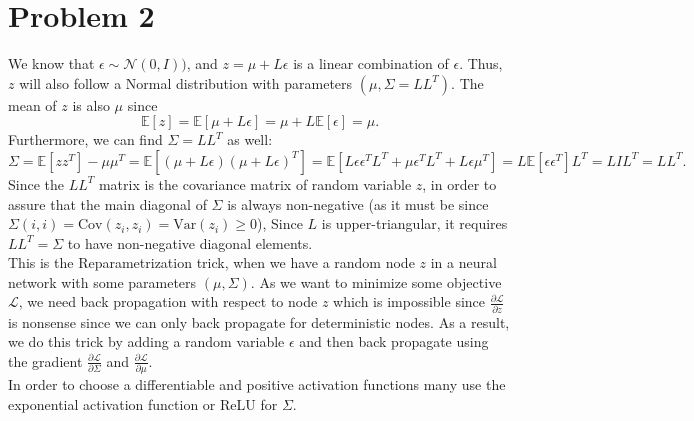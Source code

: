 \documentclass{article}
\begin{document}
\section*{Problem 2}
We know that $\epsilon \sim \mathcal{N} (0,I))$, and $z = \mu + L\epsilon$ is a linear combination of $\epsilon$. Thus, $z$ will also follow a Normal distribution with parameters $(\mu, \Sigma=LL^T)$.
The mean of $z$ is also $\mu$ since
\begin{equation*}
    \mathbb{E} [z] = \mathbb{E} [ \mu + L\epsilon] =  \mu + L \mathbb{E}[\epsilon] = \mu.    
\end{equation*}
Furthermore, we can find $\Sigma = LL^T$ as well:
\begin{equation*}
    \Sigma = \mathbb{E} [z z^T] - \mu \mu^T  =  \mathbb{E} [ (\mu + L\epsilon)( \mu + L\epsilon)^T ] = \mathbb{E} [ L \epsilon \epsilon^T L^T  + \mu \epsilon^T L^T  + L\epsilon \mu^T ] = L\mathbb{E} [ \epsilon \epsilon^T]L^T = LIL^T = LL^T.
\end{equation*}
Since the $LL^T$ matrix is the covariance matrix of random variable $z$, in order to assure that the main diagonal of $\Sigma$ is always non-negative (as it must be since $\Sigma(i,i) = \mathrm{Cov}(z_i, z_i) = \mathrm{Var}(z_i) \geq 0$), Since $L$ is upper-triangular, it requires $LL^T = \Sigma$ to have non-negative diagonal elements.
\\
This is the Reparametrization trick, when we have a random node $z$ in a neural network with some parameters $(\mu, \Sigma)$. As we want to minimize some objective $\mathcal{L}$, we need back propagation with respect to node $z$ which is impossible since $\frac{\partial \mathcal{L}}{\partial z}$ is nonsense since we can only back propagate for deterministic nodes. As a result, we do this trick by adding a random variable $\epsilon$ and then back propagate using the gradient $\frac{\partial \mathcal{L}}{\partial \Sigma}$ and  $\frac{\partial \mathcal{L}}{\partial \mu}$.\\
In order to choose a differentiable and positive activation functions many use the exponential activation function or ReLU for $\Sigma$. 
\end{document}
